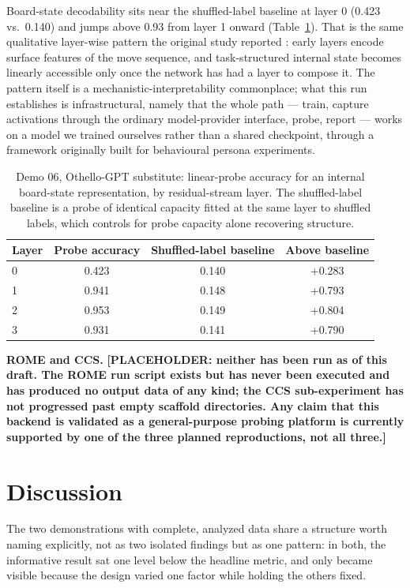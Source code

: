 \documentclass[11pt]{article}
\begin{document}
Board-state decodability sits near the shuffled-label baseline at layer 0
(0.423 vs.\ 0.140) and jumps above 0.93 from layer 1 onward
(Table~\ref{tab:othello}). That is the same qualitative layer-wise pattern
the original study reported \citep{li2023othello}: early layers encode
surface features of the move sequence, and task-structured internal state
becomes linearly accessible only once the network has had a layer to
compose it. The pattern itself is a mechanistic-interpretability
commonplace; what this run establishes is infrastructural, namely that the
whole path --- train, capture activations through the ordinary
model-provider interface, probe, report --- works on a model we trained
ourselves rather than a shared checkpoint, through a framework originally
built for behavioural persona experiments.

\begin{table}[h]
\centering
\caption{Demo 06, Othello-GPT substitute: linear-probe accuracy for an
internal board-state representation, by residual-stream layer. The
shuffled-label baseline is a probe of identical capacity fitted at the same
layer to shuffled labels, which controls for probe capacity alone
recovering structure.}
\label{tab:othello}
\begin{tabular}{@{}lccc@{}}
\toprule
Layer & Probe accuracy & Shuffled-label baseline & Above baseline \\
\midrule
0 & 0.423 & 0.140 & +0.283 \\
1 & 0.941 & 0.148 & +0.793 \\
2 & 0.953 & 0.149 & +0.804 \\
3 & 0.931 & 0.141 & +0.790 \\
\bottomrule
\end{tabular}
\end{table}

\textbf{ROME and CCS.} \textbf{[PLACEHOLDER: neither has been run as of
this draft. The ROME run script exists but has never been executed and has
produced no output data of any kind; the CCS sub-experiment has not
progressed past empty scaffold directories. Any claim that this backend is
validated as a general-purpose probing platform is currently supported by
one of the three planned reproductions, not all three.]}

\section{Discussion}

The two demonstrations with complete, analyzed data share a structure worth
naming explicitly, not as two isolated findings but as one pattern: in
both, the informative result sat one level below the headline metric, and
only became visible because the design varied one factor while holding the
others fixed.
\end{document}
